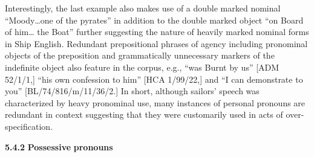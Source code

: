 Interestingly, the last example also makes use of a double marked nominal “Moody…one of the pyrates” in addition to the double marked object “on Board of him… the Boat” further suggesting the nature of heavily marked nominal forms in Ship English. Redundant prepositional phrases of agency including pronominal objects of the preposition and grammatically unnecessary markers of the indefinite object also feature in the corpus, e.g., “was Burnt by us” [ADM 52/1/1,] “his own confession to him” [HCA 1/99/22,] and “I can demonstrate to you” [BL/74/816/m/11/36/2.] In short, although sailors’ speech was characterized by heavy pronominal use, many instances of personal pronouns are redundant in context suggesting that they were customarily used in acts of over-specification.  

  \textbf{5.4.2} \textbf{Possessive} \textbf{pronouns}

